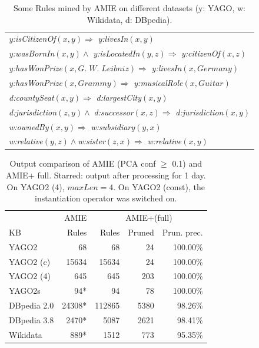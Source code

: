 \begin{table}[t]
\begin{tabular}{|l|}
\hline
\emph{y:isCitizenOf}$(x,y) \Rightarrow$ \emph{y:livesIn}$(x,y)$\\
\emph{y:wasBornIn}$(x,y) \wedge$ \emph{y:isLocatedIn}$(y,z) \Rightarrow$ \emph{y:citizenOf}$(x,z)$\\
\emph{y:hasWonPrize}$(x,G.\;W.\;Leibniz) \Rightarrow$ \emph{y:livesIn}$(x,Germany)$\\
\emph{y:hasWonPrize}$(x,Grammy) \Rightarrow$ \emph{y:musicalRole}$(x,Guitar)$\\
\emph{d:countySeat}$(x,y) \Rightarrow$ \emph{d:largestCity}$(x,y)$\\
\emph{d:jurisdiction}$(z,y) \wedge\; $\emph{d:successor}$(x,z) \Rightarrow$ \emph{d:jurisdiction}$(x,y)$\\
\emph{w:ownedBy}$(x,y) \Rightarrow$ \emph{w:subsidiary}$(y, x)$\\
\emph{w:relative}$(y,z) \wedge $\emph{w:sister}$(z, x)  \Rightarrow$ \emph{w:relative}$(x,y)$\\
\hline
\end{tabular}
\caption{Some Rules mined by AMIE on different datasets (y: YAGO, w: Wikidata, d: DBpedia).}\label{rules}
\end{table}
%
\begin{center}
\begin{savenotes}
\begin{table}[t]
\footnotesize
\centering
\begin{tabular}{|l| r |r r r|}
\hline
			& AMIE			& \multicolumn{3}{c|}{AMIE+(full)} 	\\ \cline{2-5}
KB			& Rules 		& Rules		&Pruned	& Prun. prec. 	   \\ \hline
  YAGO2  		& 68			& 68 		&24 	&100.00\%      	    \\
  YAGO2 (c)  		& 15634			& 15634		&24	&100.00\% 	    \\
  YAGO2 (4)  		& 645			& 645		&203 	&100.00\%   	    \\
  YAGO2s  		& 94*			& 94	 	&78 	&100.00\%		    \\
  DBpedia 2.0 		& 24308*		& 112865	&5380 	&98.26\%      	    		\\
  DBpedia 3.8 		& 2470*			& 5087       	&2621 	&98.41\%	    		\\
  Wikidata  		& 889*			& 1512		&773 	&95.35\%      	    \\  \hline
\end{tabular}
\caption{Output comparison of AMIE (PCA conf $\ge$ 0.1) and AMIE+ full. Starred: output after processing for 1 day. On YAGO2 (4), $maxLen=4$. On YAGO2 (const), the instantiation operator was switched on.}
\label{outputComparison}
\end{table}
\end{savenotes}
\end{center}
%
